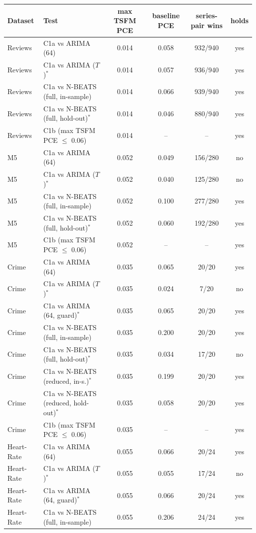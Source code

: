 \begin{tabular}{llcccc}
\toprule
Dataset & Test & max TSFM PCE & baseline PCE & series-pair wins & holds \\
\midrule
Reviews & C1a vs ARIMA (64) & 0.014 & 0.058 & 932/940 & yes \\
Reviews & C1a vs ARIMA ($T$)$^\ast$ & 0.014 & 0.057 & 936/940 & yes \\
Reviews & C1a vs N-BEATS (full, in-sample) & 0.014 & 0.066 & 939/940 & yes \\
Reviews & C1a vs N-BEATS (full, hold-out)$^\ast$ & 0.014 & 0.046 & 880/940 & yes \\
Reviews & C1b (max TSFM PCE $\le$ 0.06) & 0.014 & -- & -- & yes \\
M5 & C1a vs ARIMA (64) & 0.052 & 0.049 & 156/280 & no \\
M5 & C1a vs ARIMA ($T$)$^\ast$ & 0.052 & 0.040 & 125/280 & no \\
M5 & C1a vs N-BEATS (full, in-sample) & 0.052 & 0.100 & 277/280 & yes \\
M5 & C1a vs N-BEATS (full, hold-out)$^\ast$ & 0.052 & 0.060 & 192/280 & yes \\
M5 & C1b (max TSFM PCE $\le$ 0.06) & 0.052 & -- & -- & yes \\
Crime & C1a vs ARIMA (64) & 0.035 & 0.065 & 20/20 & yes \\
Crime & C1a vs ARIMA ($T$)$^\ast$ & 0.035 & 0.024 & 7/20 & no \\
Crime & C1a vs ARIMA (64, guard)$^\ast$ & 0.035 & 0.065 & 20/20 & yes \\
Crime & C1a vs N-BEATS (full, in-sample) & 0.035 & 0.200 & 20/20 & yes \\
Crime & C1a vs N-BEATS (full, hold-out)$^\ast$ & 0.035 & 0.034 & 17/20 & no \\
Crime & C1a vs N-BEATS (reduced, in-s.)$^\ast$ & 0.035 & 0.199 & 20/20 & yes \\
Crime & C1a vs N-BEATS (reduced, hold-out)$^\ast$ & 0.035 & 0.058 & 20/20 & yes \\
Crime & C1b (max TSFM PCE $\le$ 0.06) & 0.035 & -- & -- & yes \\
Heart-Rate & C1a vs ARIMA (64) & 0.055 & 0.066 & 20/24 & yes \\
Heart-Rate & C1a vs ARIMA ($T$)$^\ast$ & 0.055 & 0.055 & 17/24 & no \\
Heart-Rate & C1a vs ARIMA (64, guard)$^\ast$ & 0.055 & 0.066 & 20/24 & yes \\
Heart-Rate & C1a vs N-BEATS (full, in-sample) & 0.055 & 0.206 & 24/24 & yes \\

\end{tabular}
